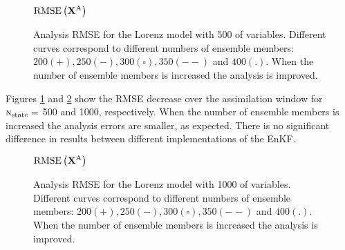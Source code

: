 \documentclass[12pt]{article}
\newcommand{\Nstate}{\textsc{n}_{{\rm state}}}
\newcommand{\XA}{{\bf X}^{\rm A}}
\begin{document}
\begin{figure}[H]
\centering
\begin{sideways} $\rm RMSE \left( \XA \right )$ \end{sideways} 
\caption{Analysis RMSE for the Lorenz model with 500 of variables. Different curves correspond to  different numbers of ensemble members: $200(+), 250(-), 300(\square), 350(--)$ and $400(.)$. When the number of ensemble members is increased the analysis is improved. }
\label{Fig:Lorenz500-Results-Simulation}
\end{figure}


Figures  \ref{Fig:Lorenz500-Results-Simulation} and  \ref{Fig:Lorenz1000-Results-Simulation} show the RMSE decrease over the assimilation window for $\Nstate =$ 500 and 1000, respectively. When the number of ensemble members is increased the analysis errors are smaller, as expected. There is no significant difference in results between different implementations of the EnKF.


\begin{figure}[H]
\centering
\begin{sideways} $\rm RMSE \left( \XA \right )$ \end{sideways} 
\caption{Analysis RMSE for the Lorenz model with 1000 of variables. Different curves correspond to  different numbers of ensemble members: $200(+), 250(-), 300(\square), 350(--)$ and $400(.)$. When the number of ensemble members is increased the analysis is improved. }
\label{Fig:Lorenz1000-Results-Simulation}
\end{figure}
\end{document}

